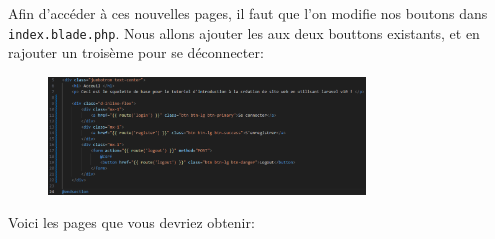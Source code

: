 \documentclass[internal]{nhitec_design}
\begin{document}
Afin d'accéder à ces nouvelles pages, il faut que l'on modifie nos boutons dans \verb|index.blade.php|. Nous allons ajouter les \routes{} aux deux bouttons existants, et en rajouter un troisème pour se déconnecter:

\begin{figure}[!h]
    \centering
    \includegraphics[width=0.75\textwidth]{figures-C1/index_auth.pdf}
\end{figure}

Voici les pages que vous devriez obtenir:
\end{document}
